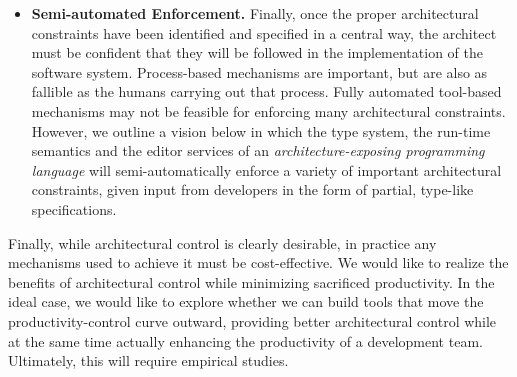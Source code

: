 \documentclass[runningheads]{llncs}
\begin{document}
\begin{sloppypar}
\begin{itemize}

\item \textbf{Semi-automated Enforcement.}  Finally, once the proper architectural constraints have been identified and specified in a central way, the architect must be confident that they will be followed in the implementation of the software system.  Process-based mechanisms are important, but are also as fallible as the humans carrying out that process.  Fully automated tool-based mechanisms may not be feasible for enforcing many architectural constraints.  However, we outline a vision below in which the type system, the run-time semantics and the editor services of an \emph{architecture-exposing programming language} will semi-automatically enforce a variety of important architectural constraints, given input from developers in the form of partial, type-like specifications.


\end{itemize}

Finally, while architectural control is clearly desirable, in practice any mechanisms used to achieve it must be cost-effective.  We would like to realize the benefits of architectural control while minimizing sacrificed productivity.  In the ideal case, we would like to explore whether we can build tools that move the productivity-control curve outward, providing better architectural control while at the same time actually enhancing the productivity of a development team. Ultimately, this will require empirical studies.



\end{sloppypar}
\end{document}
